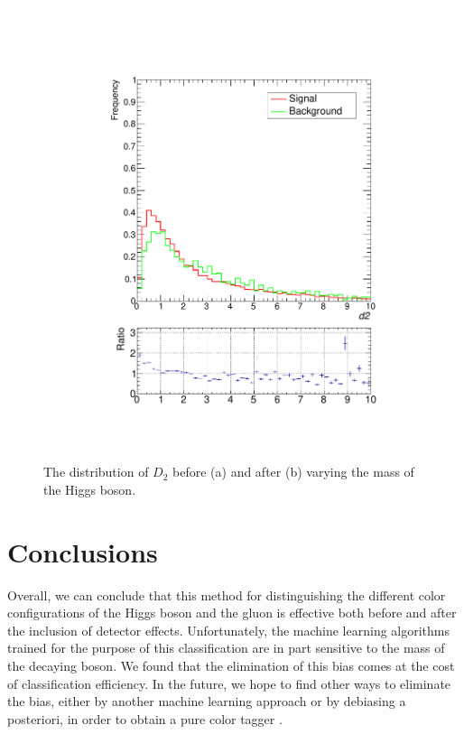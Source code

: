 \documentclass[10pt,a4paper]{book}
\begin{document}
\begin{figure}[h]
\begin{subfigure}{0.5\textwidth}
\includegraphics[scale=0.35]{ch4_images/d2_distribution_massbias}
\caption{}
\end{subfigure}
\caption{The distribution of $D_2$ before (a) and after (b) varying the mass of the Higgs boson.}
\label{d2 mass bias}
\end{figure}


\section{Conclusions}

Overall, we can conclude that this method for distinguishing the different color configurations of the Higgs boson and the gluon is effective both before and after the inclusion of detector effects. Unfortunately, the machine learning algorithms trained for the purpose of this classification are in part sensitive to the mass of the decaying boson. We found that the elimination of this bias comes at the cost of classification efficiency. In the future, we hope to find other ways to eliminate the bias, either by another machine learning approach or by debiasing a posteriori, in order to obtain a pure color tagger \cite{Dolen:2016kst, Moult:2017okx}.
\end{document}
